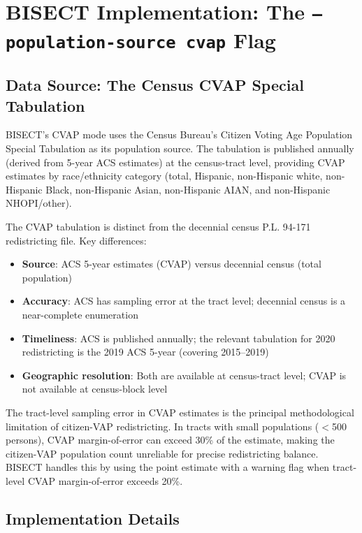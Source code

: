 \section{BISECT Implementation: The \texttt{--population-source cvap} Flag}
\label{sec:bisect}

\subsection{Data Source: The Census CVAP Special Tabulation}

BISECT's CVAP mode uses the Census Bureau's Citizen Voting Age Population Special Tabulation as its population source. The tabulation is published annually (derived from 5-year ACS estimates) at the census-tract level, providing CVAP estimates by race/ethnicity category (total, Hispanic, non-Hispanic white, non-Hispanic Black, non-Hispanic Asian, non-Hispanic AIAN, and non-Hispanic NHOPI/other).

The CVAP tabulation is distinct from the decennial census P.L. 94-171 redistricting file. Key differences:
\begin{itemize}
    \item \textbf{Source}: ACS 5-year estimates (CVAP) versus decennial census (total population)
    \item \textbf{Accuracy}: ACS has sampling error at the tract level; decennial census is a near-complete enumeration
    \item \textbf{Timeliness}: ACS is published annually; the relevant tabulation for 2020 redistricting is the 2019 ACS 5-year (covering 2015--2019)
    \item \textbf{Geographic resolution}: Both are available at census-tract level; CVAP is not available at census-block level
\end{itemize}

The tract-level sampling error in CVAP estimates is the principal methodological limitation of citizen-VAP redistricting. In tracts with small populations ($<$500 persons), CVAP margin-of-error can exceed 30\% of the estimate, making the citizen-VAP population count unreliable for precise redistricting balance. BISECT handles this by using the point estimate with a warning flag when tract-level CVAP margin-of-error exceeds 20\%.

\subsection{Implementation Details}


